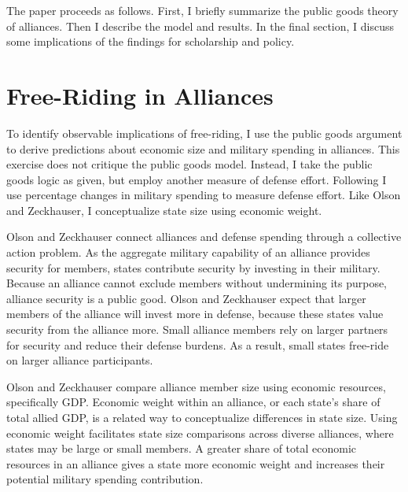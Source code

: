 \documentclass[12pt]{article}
\begin{document}
The paper proceeds as follows.
First, I briefly summarize the public goods theory of alliances.
Then I describe the model and results. 
In the final section, I discuss some implications of the findings for scholarship and policy. 



\section{Free-Riding in Alliances}

To identify observable implications of free-riding, I use the public goods argument to derive predictions about economic size and military spending in alliances.
This exercise does not critique the public goods model.
Instead, I take the public goods logic as given, but employ another measure of defense effort. 
Following \citet{PluemperNeumayer2015} I use percentage changes in military spending to measure defense effort.
Like Olson and Zeckhauser, I conceptualize state size using economic weight. 


Olson and Zeckhauser connect alliances and defense spending through a collective action problem. 
As the aggregate military capability of an alliance provides security for members, states contribute security by investing in their military.
Because an alliance cannot exclude members without undermining its purpose, alliance security is a public good. 
Olson and Zeckhauser expect that larger members of the alliance will invest more in defense, because these states value security from the alliance more.
Small alliance members rely on larger partners for security and reduce their defense burdens.
As a result, small states free-ride on larger alliance participants. 


Olson and Zeckhauser compare alliance member size using economic resources, specifically GDP.
Economic weight within an alliance, or each state's share of total allied GDP, is a related way to conceptualize differences in state size.
Using economic weight facilitates state size comparisons across diverse alliances, where states may be large or small members. 
A greater share of total economic resources in an alliance gives a state more economic weight and increases their potential military spending contribution. 
\end{document}
